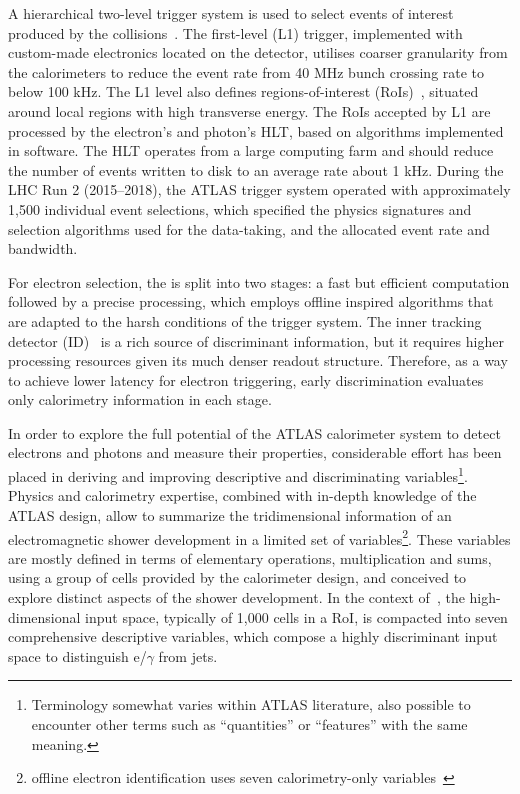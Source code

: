 A hierarchical two-level trigger system is used to select events of interest produced by the collisions~\cite{aad2020performance}. 
The first-level (L1) trigger, implemented with custom-made electronics located on the detector, utilises coarser granularity from the calorimeters to reduce the event rate from 40 MHz bunch crossing rate to below 100 kHz. 
The L1 level also defines regions-of-interest (RoIs)~\cite{CERN-LHCC-2017-020}, situated around local regions with high transverse energy. The RoIs accepted by L1 are processed by the electron's and photon's HLT, based on algorithms implemented in software. The HLT operates from a large computing farm and should reduce the number of events written to disk to an average rate about 1 kHz. During the LHC Run 2 (2015–2018), the ATLAS trigger system operated with approximately 1,500 individual event selections, which specified the physics signatures and selection algorithms used for the data-taking, and the allocated event rate and bandwidth.

For electron selection, the \hlt{} is split into two stages: a fast but efficient computation followed by a precise processing, which employs offline inspired algorithms that are adapted to the harsh conditions of the trigger system. The inner tracking detector (ID)~\cite{PERF-2007-01} is a rich source of discriminant information, but it requires higher processing resources given its much denser readout structure.  Therefore, as a way to achieve lower latency for electron triggering, early discrimination evaluates only calorimetry information in each stage.


In order to explore the full potential of the ATLAS calorimeter system to detect electrons and photons and measure their properties, considerable effort has been placed in deriving and improving descriptive and discriminating variables\footnote{Terminology somewhat varies within ATLAS literature, also possible to encounter other terms such as ``quantities'' or ``features'' with the same meaning.}. Physics and calorimetry expertise,
combined with in-depth knowledge of the ATLAS design, allow to summarize the tridimensional information of an electromagnetic shower development in a limited set of 
variables\footnote{offline electron identification uses seven calorimetry-only
variables~\cite{aaboud2019electron}}. These variables are mostly defined in
terms of elementary operations, multiplication and sums, using a group of cells provided by the calorimeter
design, and conceived to explore distinct aspects of the shower development. In the context of~\cite{aad2020performance}, the high-dimensional input space, typically of 1,000 cells in a RoI, is compacted into seven comprehensive descriptive variables, which compose a highly discriminant input space to distinguish e/$\gamma$ from jets.

